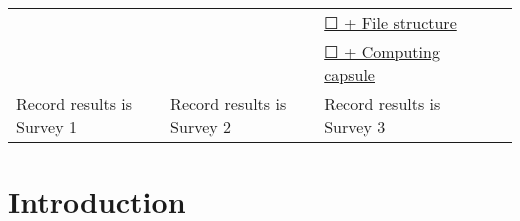 \documentclass[]{book}
\begin{document}
\begin{longtable}[]{@{}lllll@{}}
\begin{minipage}[t]{0.28\columnwidth}
\end{minipage} & \begin{minipage}[t]{0.27\columnwidth}\raggedright
\strut
\end{minipage} & \begin{minipage}[t]{0.19\columnwidth}\raggedright
\protect\hyperlink{paper-level}{☐ + File structure}\strut
\end{minipage} & \begin{minipage}[t]{0.07\columnwidth}\raggedright
\strut
\end{minipage} & \begin{minipage}[t]{0.06\columnwidth}\raggedright
\strut
\end{minipage}\tabularnewline
\begin{minipage}[t]{0.28\columnwidth}\raggedright
\strut
\end{minipage} & \begin{minipage}[t]{0.27\columnwidth}\raggedright
\strut
\end{minipage} & \begin{minipage}[t]{0.19\columnwidth}\raggedright
\protect\hyperlink{paper-level}{☐ + Computing capsule}\strut
\end{minipage} & \begin{minipage}[t]{0.07\columnwidth}\raggedright
\strut
\end{minipage} & \begin{minipage}[t]{0.06\columnwidth}\raggedright
\strut
\end{minipage}\tabularnewline
\begin{minipage}[t]{0.28\columnwidth}\raggedright
Record results is Survey 1\strut
\end{minipage} & \begin{minipage}[t]{0.27\columnwidth}\raggedright
Record results is Survey 2\strut
\end{minipage} & \begin{minipage}[t]{0.19\columnwidth}\raggedright
Record results is Survey 3\strut
\end{minipage} & \begin{minipage}[t]{0.07\columnwidth}\raggedright
\strut
\end{minipage} & \begin{minipage}[t]{0.06\columnwidth}\raggedright
\strut
\end{minipage}\tabularnewline
\bottomrule
\end{longtable}

\hypertarget{intro}{%
\chapter{Introduction}\label{intro}}
\end{document}
